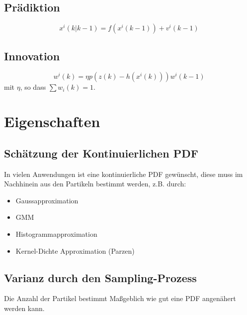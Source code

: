 \subsection{Prädiktion}
\begin{equation*}
    x^i(k|k-1) = f(x^i(k-1)) + v^i(k-1)
\end{equation*}

\subsection{Innovation}
\begin{equation*}
    w^i(k) = \eta p(z(k) - h(x^i(k))) w^i(k-1)
\end{equation*}
mit $\eta$, so dass $\sum w_i(k) = 1$.

\section{Eigenschaften}
\subsection{Schätzung der Kontinuierlichen PDF}
In vielen Anwendungen ist eine kontinuierliche PDF gewünscht, diese muss im Nachhinein aus den Partikeln bestimmt werden, z.B. durch:
\begin{itemize}
    \item Gaussapproximation
    \item GMM
    \item Histogrammapproximation
    \item Kernel-Dichte Approximation (Parzen)
\end{itemize}

\subsection{Varianz durch den Sampling-Prozess}
Die Anzahl der Partikel bestimmt Maßgeblich wie gut eine PDF angenähert werden kann.
